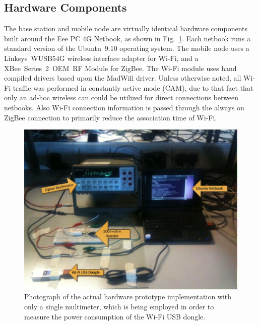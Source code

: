 \documentclass[conference]{IEEEtran}
\begin{document}
\subsection{Hardware Components}
The base station and mobile node are virtually identical hardware
components built around the Eee PC 4G Netbook, as shown in
Fig.~\ref{f:prototype}. Each netbook runs a standard version of the
Ubuntu~9.10 operating system. The mobile node uses a Linksys~WUSB54G
wireless interface adapter for Wi-Fi, and a XBee~Series~2~OEM~RF
Module for ZigBee. The Wi-Fi module uses hand compiled drivers based
upon the MadWifi driver. Unless otherwise noted, all Wi-Fi traffic
was performed in constantly active mode (CAM), due to that fact that
only an ad-hoc wireless can could be utilized for direct connections
between netbooks.  Also Wi-Fi connection information is passed
through the always on ZigBee connection to primarily reduce the
association time of Wi-Fi.
\begin{figure}[t]
\begin{center}
\includegraphics[scale=0.50]{actual_testbench.eps}
\caption{Photograph of the actual hardware prototype implementation
with only a single multimeter, which is being employed in order to
measure the power consumption of the Wi-Fi USB dongle.}
\end{center}\label{f:prototype}
\end{figure}
\end{document}
